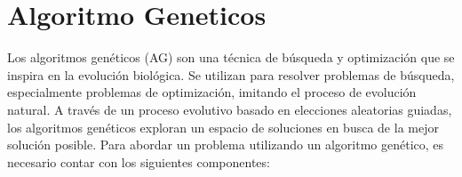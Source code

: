 
\section{Algoritmo Geneticos}
Los algoritmos genéticos (AG) son una técnica de búsqueda y optimización que se inspira en la evolución biológica. Se utilizan para resolver problemas de búsqueda, especialmente problemas de optimización, imitando el proceso de evolución natural. A través de un proceso evolutivo basado en elecciones aleatorias guiadas, los algoritmos genéticos exploran un espacio de soluciones en busca de la mejor solución posible.
Para abordar un problema utilizando un algoritmo genético, es necesario contar con los siguientes componentes:

